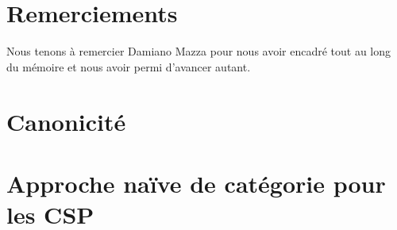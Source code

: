 \documentclass[12pt]{article}
\begin{document}
\section*{Remerciements}

Nous tenons à remercier Damiano Mazza pour nous avoir encadré tout au long du
mémoire et nous avoir permi d'avancer autant.


\appendix
\section{Canonicité}\label{appCanon}


\section{Approche naïve de catégorie pour les CSP}\label{appNaif}

\end{document}
